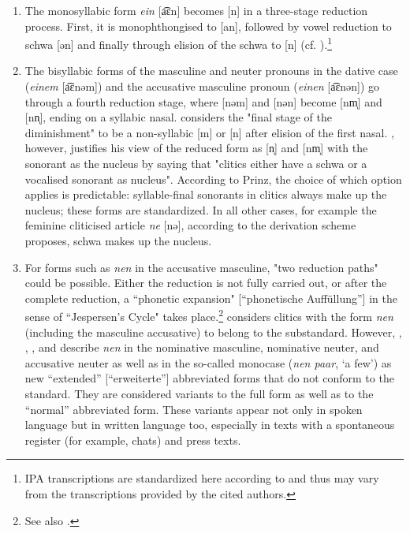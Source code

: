 \begin{enumerate}
\item The monosyllabic form \textit{ein} [a͡ɛn] becomes [n] in a three-stage reduction process.
First, it is monophthongised to [an], followed by vowel reduction to schwa [ən] and finally through elision of the schwa to [n] (cf. \citealt[47]{Dedenbach1987}).\footnote{
	IPA transcriptions are standardized here according to \citet{KrechEa2009} and thus may vary from the transcriptions provided by the cited authors.}
\item The bisyllabic forms of the masculine and neuter pronouns in the dative case (\textit{einem} [a͡ɛnəm]) and the accusative masculine pronoun (\textit{einen} [a͡ɛnən]) go through a fourth reduction stage, where [nəm] and [nən] become [nm̩] and [nn̩], ending on a syllabic nasal.
\citet[48]{Dedenbach1987} considers the "final stage of the diminishment" to be a non-syllabic [m] or [n] after elision of the first nasal.
\citet[93]{Prinz1991}, however, justifies his view of the reduced form as [n̩] and [nm̩] with the sonorant as the nucleus by saying that "clitics either have a schwa or a vocalised sonorant as nucleus".
According to Prinz, the choice of which option applies is predictable: syllable-final sonorants in clitics always make up the nucleus; these forms are standardized.
In all other cases, for example the feminine cliticised article \textit{ne} [nə], according to the derivation scheme \citet[92]{Prinz1991} proposes, schwa makes up the nucleus.
\item For forms such as \textit{nen} in the accusative masculine, "two reduction paths" \citep[76]{Ziegler2011} could be possible.
Either the reduction is not fully carried out, or after the complete reduction, a ``phonetic expansion" [``phonetische Auffüllung''] in the sense of ``Jespersen's Cycle" takes place.\footnote{
	See also \citet[189]{Vogel2006}.}
\citet[84]{Prinz1991} considers clitics with the form \textit{nen} (including the masculine accusative) to belong to the substandard.
However, \citet{Vogel2006}, \citet{Burri2003}, \citet{Tophinke2002}, and \citet{Ziegler2011,Ziegler2012} describe \textit{nen} in the nominative masculine, nominative neuter, and accusative neuter as well as in the so-called monocase (\textit{nen paar}, `a few') as new ``extended'' [``erweiterte''] abbreviated forms that do not conform to the standard.
They are considered variants to the full form as well as to the ``normal'' abbreviated form.
These variants appear not only in spoken language but in written language too, especially in texts with a spontaneous register (for example, chats) and press texts.
\end{enumerate}

